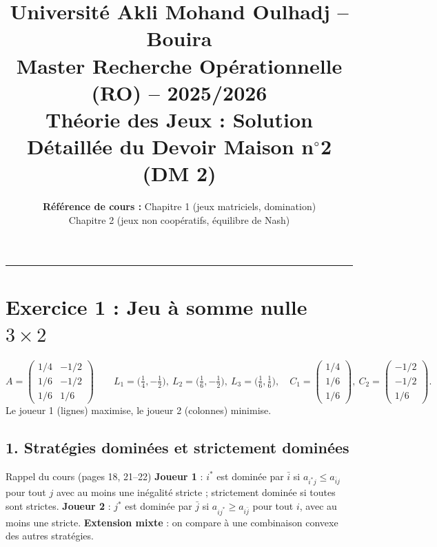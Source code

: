 \documentclass[11pt,a4paper]{article}
\title{\textbf{Université Akli Mohand Oulhadj -- Bouira}\\
\large Master Recherche Opérationnelle (RO) -- 2025/2026\\
\Large \textbf{Théorie des Jeux : Solution Détaillée du Devoir Maison n$^\circ$2 (DM 2)}}
\author{\textbf{Référence de cours :} Chapitre 1 (jeux matriciels, domination)\\ Chapitre 2 (jeux non coopératifs, équilibre de Nash)}
\date{}
\begin{document}
\maketitle
\hrule
\vspace{0.4cm}

\section*{Exercice 1 : Jeu à somme nulle $3\times 2$}

\[
A=\begin{pmatrix} 1/4 & -1/2\\ 1/6 & -1/2\\ 1/6 & 1/6\end{pmatrix}
\qquad
L_1=\Big(\tfrac14,-\tfrac12\Big),\ L_2=\Big(\tfrac16,-\tfrac12\Big),\ L_3=\Big(\tfrac16,\tfrac16\Big),\quad
C_1=\begin{pmatrix}1/4\\1/6\\1/6\end{pmatrix},\ C_2=\begin{pmatrix}-1/2\\-1/2\\1/6\end{pmatrix}.
\]
Le joueur 1 (lignes) maximise, le joueur 2 (colonnes) minimise.

\subsection*{1. Stratégies dominées et strictement dominées}

\begin{propbox}{Rappel du cours (pages 18, 21--22)}
\textbf{Joueur 1} : $i^*$ est dominée par $\bar i$ si $a_{i^*j}\le a_{\bar ij}$ pour tout $j$ avec au moins une inégalité stricte ; strictement dominée si toutes sont strictes. \textbf{Joueur 2} : $j^*$ est dominée par $\bar j$ si $a_{ij^*}\ge a_{i\bar j}$ pour tout $i$, avec au moins une stricte. \textbf{Extension mixte} : on compare à une combinaison convexe des autres stratégies.
\end{propbox}
\end{document}
